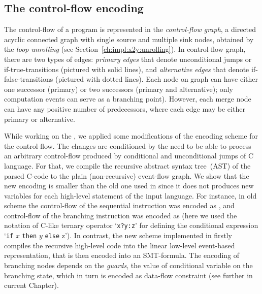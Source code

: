 \subsection{The control-flow encoding} %
\label{ch:port:enc:cf}

The control-flow of a program is represented in the \textit{control-flow graph}, a directed acyclic connected graph with single source and multiple sink nodes, obtained by the \textit{loop unrolling} (see Section~\ref{ch:impl:x2y:unrolling}).%
In control-flow graph, there are two types of edges: \textit{primary edges} that denote unconditional jumps or if-true-transitions (pictured with solid lines), and \textit{alternative edges} that denote if-false-transitions (pictured with dotted lines). Each node on graph can have either one successor (primary) or two successors (primary and alternative); only computation events can serve as a branching point). However, each merge node can have any positive number of predecessors, where each edge may be either primary or alternative.

While working on the , we applied some modifications of the encoding scheme for the control-flow. The changes are conditioned by the need to be able to process an arbitrary control-flow produced by conditional and unconditional jumps of C language. 
For that, we compile the recursive abstract syntax tree~(AST) of the parsed C-code to the plain (non-recursive) event-flow graph.
We show%
that the new encoding is smaller than the old one used in \Porthos since it does not produces new variables for each high-level statement of the input language.
For instance, in old scheme the control-flow of the sequential instruction  was encoded as 
, 
and control-flow of the branching instruction  was encoded as 
 (here we used the notation of C-like ternary operator `\texttt{x?y:z}' for defining the conditional expression `\texttt{if} $x$ \texttt{then} $y$ \texttt{else} z').
In contrast, the new scheme implemented in  firstly compiles the recursive high-level code into the linear low-level event-based representation, that is then encoded into an SMT-formula. The encoding of branching nodes depends on the \textit{guards}, the value of conditional variable on the branching state, which in turn is encoded as data-flow constraint (see further in current Chapter).

